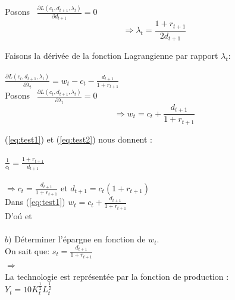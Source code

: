 \documentclass[11pt,twoside,a4paper]{article}
\begin{document}
Posons \ $ \frac{\partial L(c_t,d_{t+1},\lambda_t)}{\partial d_{t+1}} = 0 $ \\

  \begin{equation}\label{eq:test2}
  \Rightarrow \lambda_t=\frac{1+r_{t+1}}{2 d_{t+1}}
\end{equation}  

Faisons la dérivée de la fonction Lagrangienne par rapport $\lambda_t :  $ \\ \\
 
$
\frac{\partial L(c_t,d_{t+1},\lambda_t)}{\partial \lambda_t} = w_t-c_t - \frac{d_{t+1}}{1+r_{t+1}} 
$ \\

Posons \ $ \frac{\partial L(c_t,d_{t+1},\lambda_t)}{\partial \lambda_t} = 0 $ \\

 \begin{equation}\label{eq:test3}
  \Rightarrow w_t=c_t + \frac{d_{t+1}}{1+r_{t+1}}
\end{equation}
    

(\ref{eq:test1}) et (\ref{eq:test2}) nous donnent : \\ \\

$
\frac{1}{c_t} = \frac{1+r_{t+1}}{d_{t+1}}
$\\ \\

$ \Rightarrow c_t= \frac{d_{t+1}}{1+r_{t+1}}$  et  $ d_{t+1}= c_t ({1+r_{t+1}})$\\

Dans (\ref{eq:test1})\: $ w_t=c_t + \frac{d_{t+1}}{1+r_{t+1}}$ \\

D'o\'{u} \:
  \: et \: \\ \\
 $b)$  Déterminer l'épargne en fonction de $w_t$.\\
 
 On sait que: $ s_t = \frac{d_{t+1}}{1+r_{t+1}} $\\
 
 $ \Rightarrow$   \\
 
 La technologie est représentée par la fonction de production :\\
 
 $Y_t=10K_t^{\frac{1}{2}}L_t^{\frac{1}{2}}$\\
 
\end{document}
